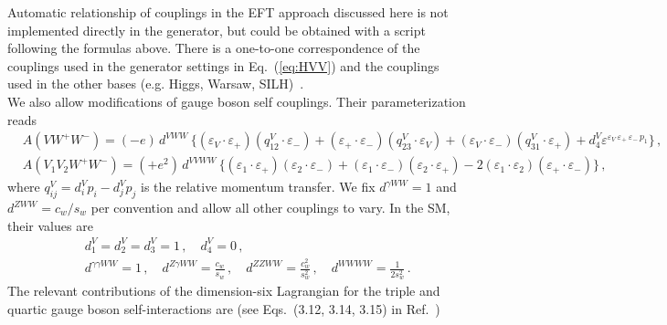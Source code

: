 \documentclass[aps,superscriptaddress,nofootinbib]{revtex4}
\begin{document}
Automatic relationship of couplings in the EFT approach discussed here is not implemented directly in the generator, 
but could be obtained with a script following the formulas above. 
There is a one-to-one correspondence of the couplings used in the generator settings in Eq.~(\ref{eq:HVV}) 
and the couplings used in the other bases (e.g. Higgs, Warsaw, SILH)~\cite{deFlorian:2016spz}. 
\\


We also allow modifications of gauge boson self couplings. 
Their parameterization reads
\begin{eqnarray}
 & A({VW^+W^-}) = (-e) \,  d^{VWW} \, \bigg\{  
                          (\varepsilon_V \cdot \varepsilon_+)(q_{12}^V \cdot \varepsilon_-)
                         +(\varepsilon_+ \cdot \varepsilon_-)(q_{23}^V \cdot \varepsilon_V)
                         +(\varepsilon_V \cdot \varepsilon_-)(q_{31}^V \cdot \varepsilon_+)
                         + d^V_4 \varepsilon^{\varepsilon_V\,\varepsilon_+\,\varepsilon_-\,p_1}
                               \bigg\} \,, \;\;
\label{eq:VVV}                               
\\
 & A({V_1 V_2 W^+W^-}) = (+e^2) \,  d^{VVWW} \, \bigg\{  
                               (\varepsilon_{1} \cdot \varepsilon_{+})  (\varepsilon_{2} \cdot \varepsilon_{-})
                              +(\varepsilon_{1} \cdot \varepsilon_{-})  (\varepsilon_{2} \cdot \varepsilon_{+})
                             -2(\varepsilon_{1} \cdot \varepsilon_{2})  (\varepsilon_{+} \cdot \varepsilon_{-})
                               \bigg\} \,,
\label{eq:VVVV}
\end{eqnarray}
where $q_{ij}^V = d_i^V p_i - d_j^V p_j$ is the relative momentum transfer. 
We fix $d^{\gamma WW}  = 1$ and $d^{Z WW} = {c_w}/{s_w}$ per convention and allow all other couplings to vary. 
In the SM, their values are
\begin{eqnarray}
\label{eq:VVVVSM}
&& d_1^V =d_2^V =d_3^V =1\,,
\quad
d_4^V=0\,, 
\\
&& d^{\gamma\gamma WW} = 1\,,
\quad
d^{Z\gamma WW} = \frac{c_w}{s_w}\,,
\quad
d^{ZZWW} = \frac{c_w^2}{s_w^2}\,,
\quad
d^{WWWW} = \frac{1}{2 s_w^2} \,. 
\nonumber
\end{eqnarray}
The relevant contributions of the dimension-six Lagrangian for the triple and quartic gauge boson self-interactions are 
(see Eqs.~(3.12, 3.14, 3.15)  in Ref.~\cite{Falkowski:2001958})
\end{document}
